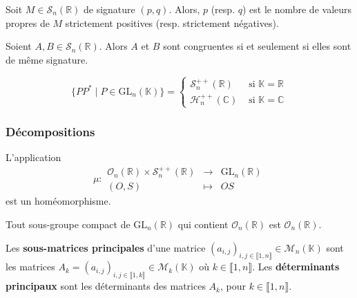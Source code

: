 
  \begin{remark}
    Soit $M \in \mathcal{S}_n(\mathbb{R})$ de signature $(p,q)$. Alors, $p$ (resp. $q$) est le nombre de valeurs propres de $M$ strictement positives (resp. strictement négatives).
  \end{remark}

  \begin{corollary}
    Soient $A, B \in \mathcal{S}_n(\mathbb{R})$. Alors $A$ et $B$ sont congruentes si et seulement si elles sont de même signature.
  \end{corollary}


  \begin{application}
    \[
      \{ P P^* \mid P \in \mathrm{GL}_n(\mathbb{K}) \} =
      \begin{cases}
        \mathcal{S}_n^{++}(\mathbb{R}) &\text{ si } \mathbb{K} = \mathbb{R} \\
        \mathcal{H}_n^{++}(\mathbb{C}) &\text{ si } \mathbb{K} = \mathbb{C}
      \end{cases}
    \]
  \end{application}

  \subsubsection{Décompositions}


  \begin{application}
    L'application
    \[ \mu :
    \begin{array}{ccc}
      \mathcal{O}_n(\mathbb{R}) \times \mathcal{S}_n^{++}(\mathbb{R}) &\rightarrow& \mathrm{GL}_n(\mathbb{R}) \\
      (O, S) &\mapsto& OS
    \end{array}
    \]
    est un homéomorphisme.
  \end{application}

  \begin{corollary}
    Tout sous-groupe compact de $\mathrm{GL}_n(\mathbb{R})$ qui contient $\mathcal{O}_n(\mathbb{R})$ est $\mathcal{O}_n(\mathbb{R})$.
  \end{corollary}


  \begin{definition}
    Les \textbf{sous-matrices principales} d'une matrice $(a_{i,j})_{i,j \in \llbracket 1, n \rrbracket} \in \mathcal{M}_n(\mathbb{K})$ sont les matrices $A_k = (a_{i,j})_{i,j \in \llbracket 1, k \rrbracket} \in \mathcal{M}_k(\mathbb{K})$ où $k \in \llbracket 1, n \rrbracket$. Les \textbf{déterminants principaux} sont les déterminants des matrices $A_k$, pour $k \in \llbracket 1, n \rrbracket$.
  \end{definition}

